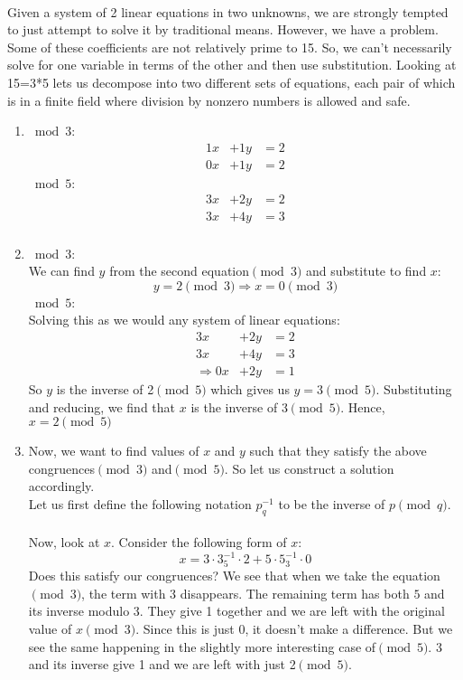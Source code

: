 \documentclass[]{article}
\begin{document}
\begin{qunlist}
{{\\Given a system of 2 linear equations in two unknowns, we are strongly tempted to just attempt to solve it by traditional means. However, we have a problem. Some of these coefficients are not relatively prime to 15. So, we can't necessarily solve for one variable in terms of the other and then use substitution. Looking at 15=3*5 lets us decompose into two different sets of equations, each pair of which is in a finite field where division by nonzero numbers is allowed and safe.
  \begin{enumerate}
  \item $\bmod 3$:
    \begin{align*}
        1x &+ 1y &= 2 \\
        0x &+ 1y &= 2 
      \end{align*}
      $\bmod 5$:
      \begin{align*}
        3x &+ 2y &= 2 \\
        3x &+ 4y &= 3 \\
      \end{align*}
    \item
      $\bmod 3$:\\
      We can find $y$ from the second equation$\pmod 3$ and substitute to find $x$:
      $$y = 2\pmod 3 \Rightarrow x = 0\pmod 3$$
      $\bmod 5$:\\
      Solving this as we would any system of linear equations:
      \begin{align*}
	3x &+ 2y &= 2 \\
	3x &+ 4y &= 3 \\
	\Rightarrow 0x &+ 2y &= 1
      \end{align*}
      So $y$ is the inverse of 2$\pmod 5$ which gives us $y = 3\pmod 5$. Substituting and reducing, we find that $x$ is the inverse of 3$\pmod 5$. Hence, $x = 2\pmod 5$\\
    \item Now, we want to find values of $x$ and $y$ such that they satisfy the above congruences$\pmod 3$ and$\pmod 5$. So let us construct a solution accordingly.
      \\ Let us first define the following notation $p^{-1}_q$ to be the inverse of $p\pmod q$.
      \\\\ Now, look at $x$. Consider the following form of $x$:
      $$x = 3 \cdot 3^{-1}_5 \cdot 2 + 5 \cdot 5^{-1}_3 \cdot 0$$
      Does this satisfy our congruences? We see that when we take the equation$\pmod 3$, the term with 3 disappears. The remaining term has both $5$ and its inverse modulo 3. They give 1 together and we are left with the original value of $x\pmod 3$. Since this is just 0, it doesn't make a difference. But we see the same happening in the slightly more interesting case of$\pmod 5$. 3 and its inverse give 1 and we are left with just 2$\pmod 5$.

\end{enumerate}}}
\end{qunlist}
\end{document}
